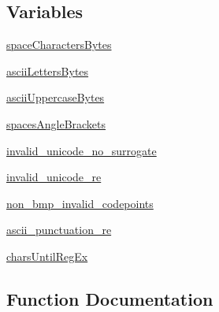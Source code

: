\subsection*{Variables}
\begin{DoxyCompactItemize}
\item 
\hyperlink{namespacepip_1_1__vendor_1_1html5lib_1_1__inputstream_aeb15a38012f4cc3525cf485fb8760b46}{space\+Characters\+Bytes}
\item 
\hyperlink{namespacepip_1_1__vendor_1_1html5lib_1_1__inputstream_a75c504743c6f7412e99097fc8ad0a357}{ascii\+Letters\+Bytes}
\item 
\hyperlink{namespacepip_1_1__vendor_1_1html5lib_1_1__inputstream_a74c8230e755dd7f3f12d9e7341a15830}{ascii\+Uppercase\+Bytes}
\item 
\hyperlink{namespacepip_1_1__vendor_1_1html5lib_1_1__inputstream_ae27931734bde0ab879b8bbc9962b6c1b}{spaces\+Angle\+Brackets}
\item 
\hyperlink{namespacepip_1_1__vendor_1_1html5lib_1_1__inputstream_a8763554cd84038ea03e1ee65eb954d1b}{invalid\+\_\+unicode\+\_\+no\+\_\+surrogate}
\item 
\hyperlink{namespacepip_1_1__vendor_1_1html5lib_1_1__inputstream_a2d893d3c2564568da5bfa822f0c85a43}{invalid\+\_\+unicode\+\_\+re}
\item 
\hyperlink{namespacepip_1_1__vendor_1_1html5lib_1_1__inputstream_a1c8f18ec068c3160365efee87704fc1d}{non\+\_\+bmp\+\_\+invalid\+\_\+codepoints}
\item 
\hyperlink{namespacepip_1_1__vendor_1_1html5lib_1_1__inputstream_aa34e0c76a6247e6e225b9203407603e8}{ascii\+\_\+punctuation\+\_\+re}
\item 
\hyperlink{namespacepip_1_1__vendor_1_1html5lib_1_1__inputstream_a2d6b7bd24ceaaf24fc3b001edb369d2c}{chars\+Until\+Reg\+Ex}
\end{DoxyCompactItemize}


\subsection{Function Documentation}
\mbox{\label{namespacepip_1_1__vendor_1_1html5lib_1_1__inputstream_a346ca791e1884dac06ef78e3b3c57194}} 

